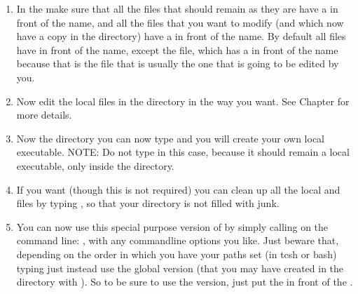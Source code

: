 \documentclass[letterpaper,10pt,english]{sphinxmanual}
\begin{document}
\begin{itemize}
\begin{enumerate}
\item {} 
In the  make sure that all the
 files that should remain as they are have a 
in front of the name, and all the  files that
you want to modify (and which now have a copy in the 
directory) have a  in front of the name. By
default all  files have  in front of
the name, except the  file, which has a
 in front of the name because that is the file that is
usually the one that is going to be edited by you.

\item {} 
Now edit the local  files in the  directory
in the way you want. See Chapter {\hyperref[\detokenize{internalsetup:chap-internal-setup}]{}} for more details.

\item {} 
Now  the  directory you can now type
 and you will create your own local  executable.
NOTE: Do not type  in this case, because it should
remain a local executable, only inside the  directory.

\item {} 
If you want (though this is not required) you can clean up all the
local  and  files by typing , so that your  directory is not filled
with junk.

\item {} 
You can now use this special purpose version of 
by simply calling on the command line: , with any
command\sphinxhyphen{}line options you like. Just beware that, depending on the order
in which you have your paths set (in tcsh or bash) typing just
  instead use the global version (that you
may have created in the  directory with ). So to be sure to use the  version, just put the
 in front of the .

\end{enumerate}

\end{itemize}
\end{document}
